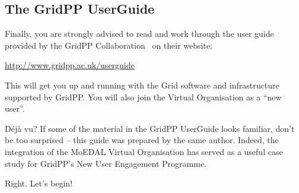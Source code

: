 \subsection{The GridPP UserGuide}
\label{sec:gridppuserguide}
Finally, you are strongly advised to read and work through the
user guide provided by the GridPP Collaboration~\cite{gridpp2006,gridpp2009}
on their website:

\href{http://www.gridpp.ac.uk/userguide}{http://www.gridpp.ac.uk/userguide}

This will get you up and running with the Grid software and
infrastructure supported by GridPP. You will also join the
 Virtual Organisation as a ``new user''.

\begin{infobox}{D\'ej\`a vu?}
If some of the material in the GridPP UserGuide looks familiar,
don't be too surprised -- this guide was prepared by the same
author. Indeed, the integration of the MoEDAL Virtual Organisation
has served as a useful case study for GridPP's
New User Engagement Programme.
\end{infobox}

Right. Let's begin!
